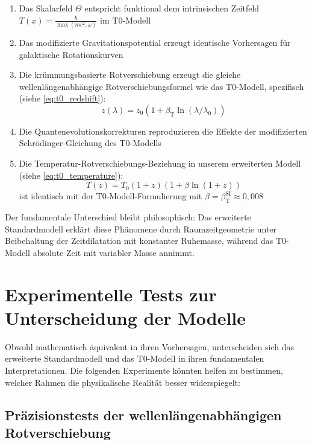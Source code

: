 \documentclass[12pt,a4paper]{article}
\newcommand{\Tfield}{T(x)}
\newcommand{\betaT}{\beta_{\text{T}}}
\begin{document}
	\begin{enumerate}
		\item Das Skalarfeld $\Theta$ entspricht funktional dem intrinsischen Zeitfeld $\Tfield = \frac{\hbar}{\max(mc^2, \omega)}$ im T0-Modell\cite{pascher_lagrange_2025}
		\item Das modifizierte Gravitationspotential erzeugt identische Vorhersagen für galaktische Rotationskurven\cite{pascher_galaxies_2025}
		\item Die krümmungsbasierte Rotverschiebung erzeugt die gleiche wellenlängenabhängige Rotverschiebungsformel wie das T0-Modell\cite{pascher_messdifferenzen_2025}, spezifisch (siehe \cref{eq:t0_redshift}):
		\begin{equation}
			z(\lambda) = z_0(1 + \betaT \ln(\lambda/\lambda_0))
		\end{equation}
		\item Die Quantenevolutionskorrekturen reproduzieren die Effekte der modifizierten Schrödinger-Gleichung des T0-Modells\cite{pascher_zeit_2025}
		\item Die Temperatur-Rotverschiebungs-Beziehung in unserem erweiterten Modell (siehe \cref{eq:t0_temperature}):
		\begin{equation}
			T(z) = T_0 (1+z)(1+\beta \ln(1+z))
		\end{equation}
		ist identisch mit der T0-Modell-Formulierung mit $\beta = \betaT^{\text{SI}} \approx 0,008$\cite{pascher_temp_2025}
	\end{enumerate}
	
	Der fundamentale Unterschied bleibt philosophisch: Das erweiterte Standardmodell erklärt diese Phänomene durch Raumzeitgeometrie unter Beibehaltung der Zeitdilatation mit konstanter Ruhemasse, während das T0-Modell absolute Zeit mit variabler Masse annimmt\cite{pascher_zeit_masse_2025}.
	
	\section{Experimentelle Tests zur Unterscheidung der Modelle}
	\label{sec:experimental_tests}
	
	Obwohl mathematisch äquivalent in ihren Vorhersagen, unterscheiden sich das erweiterte Standardmodell und das T0-Modell in ihren fundamentalen Interpretationen. Die folgenden Experimente könnten helfen zu bestimmen, welcher Rahmen die physikalische Realität besser widerspiegelt:
	
	\subsection{Präzisionstests der wellenlängenabhängigen Rotverschiebung}
	\label{subsec:redshift_tests}
	
\end{document}
